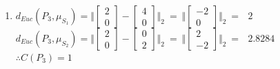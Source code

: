 \documentclass[letterpaper]{article}
\begin{document}
\begin{enumerate}
\begin{enumerate}
	\item[(iii)] $ d_{Euc}(P_3 , \mu_{S_1}) = \Vert \begin{bmatrix} 2 \\ 0\end{bmatrix} - \begin{bmatrix} 4 \\ 0\end{bmatrix} \Vert_2 ~=~ \Vert \begin{bmatrix} -2 \\ 0\end{bmatrix} \Vert_2 ~=~~~ 2$	\\ \vskip 1mm
	$ d_{Euc}(P_3 , \mu_{S_2}) = \Vert \begin{bmatrix} 2 \\ 0\end{bmatrix} - \begin{bmatrix} 0 \\ 2\end{bmatrix} \Vert_2 ~=~ \Vert \begin{bmatrix} 2 \\ -2\end{bmatrix} \Vert_2 ~=~~~ 
	2.8284$ \\ \vskip 1mm
	$\therefore C(P_3) = 1$
\end{enumerate}


\end{enumerate}
\end{document}
